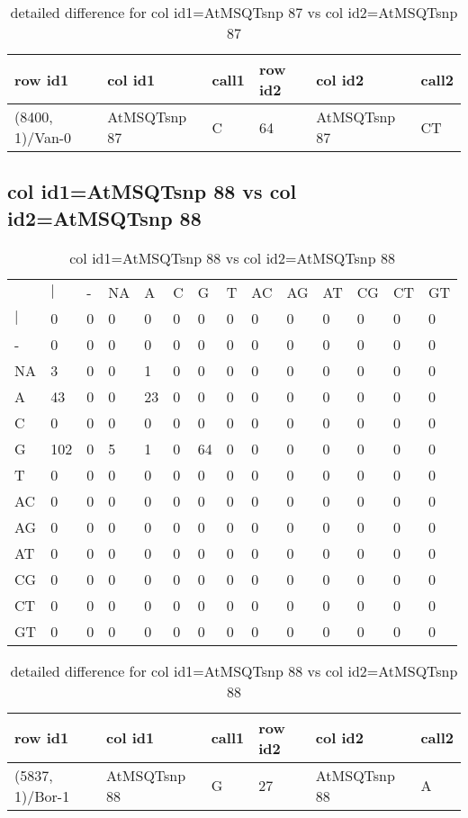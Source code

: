 \begin{center}
\begin{longtable}{|l|l|l|l|l|l|}
\caption{detailed difference for col id1=AtMSQTsnp 87 vs col id2=AtMSQTsnp 87} \label{table_dm771}\\
\hline
row id1&col id1&call1&row id2&col id2&call2\\
\hline
(8400, 1)/Van-0&AtMSQTsnp 87&C&64&AtMSQTsnp 87&CT\\
\hline
\end{longtable}
\end{center}

\subsection{col id1=AtMSQTsnp 88 vs col id2=AtMSQTsnp 88}
\begin{center}
\begin{longtable}{|l|l|l|l|l|l|l|l|l|l|l|l|l|l|}
\caption{col id1=AtMSQTsnp 88 vs col id2=AtMSQTsnp 88} \label{table_dm772}\\
\hline
\\
\hline
&$|$&-&NA&A&C&G&T&AC&AG&AT&CG&CT&GT\\
$|$&0&0&0&0&0&0&0&0&0&0&0&0&0\\
-&0&0&0&0&0&0&0&0&0&0&0&0&0\\
NA&3&0&0&1&0&0&0&0&0&0&0&0&0\\
A&43&0&0&23&0&0&0&0&0&0&0&0&0\\
C&0&0&0&0&0&0&0&0&0&0&0&0&0\\
G&102&0&5&1&0&64&0&0&0&0&0&0&0\\
T&0&0&0&0&0&0&0&0&0&0&0&0&0\\
AC&0&0&0&0&0&0&0&0&0&0&0&0&0\\
AG&0&0&0&0&0&0&0&0&0&0&0&0&0\\
AT&0&0&0&0&0&0&0&0&0&0&0&0&0\\
CG&0&0&0&0&0&0&0&0&0&0&0&0&0\\
CT&0&0&0&0&0&0&0&0&0&0&0&0&0\\
GT&0&0&0&0&0&0&0&0&0&0&0&0&0\\
\hline
\end{longtable}
\end{center}

\begin{center}
\begin{longtable}{|l|l|l|l|l|l|}
\caption{detailed difference for col id1=AtMSQTsnp 88 vs col id2=AtMSQTsnp 88} \label{table_dm773}\\
\hline
row id1&col id1&call1&row id2&col id2&call2\\
\hline
(5837, 1)/Bor-1&AtMSQTsnp 88&G&27&AtMSQTsnp 88&A\\
\hline
\end{longtable}
\end{center}

